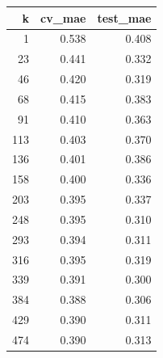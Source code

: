 \begin{tabular}{rrr}
\toprule
k & cv_mae & test_mae \\
\midrule
1 & 0.538 & 0.408 \\
23 & 0.441 & 0.332 \\
46 & 0.420 & 0.319 \\
68 & 0.415 & 0.383 \\
91 & 0.410 & 0.363 \\
113 & 0.403 & 0.370 \\
136 & 0.401 & 0.386 \\
158 & 0.400 & 0.336 \\
203 & 0.395 & 0.337 \\
248 & 0.395 & 0.310 \\
293 & 0.394 & 0.311 \\
316 & 0.395 & 0.319 \\
339 & 0.391 & 0.300 \\
384 & 0.388 & 0.306 \\
429 & 0.390 & 0.311 \\
474 & 0.390 & 0.313 \\
\bottomrule
\end{tabular}
